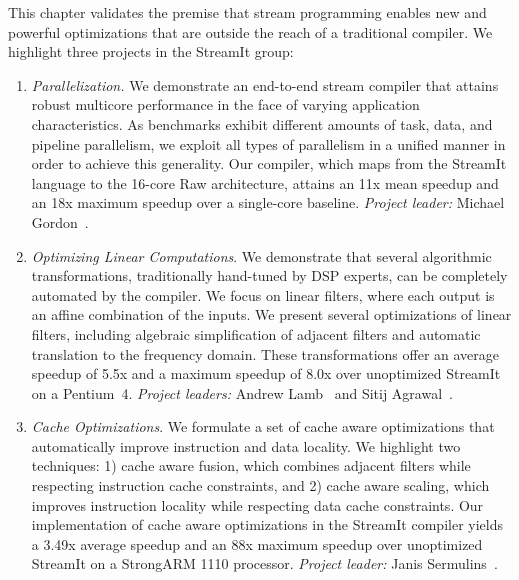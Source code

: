 \label{chap:optimizing}

This chapter validates the premise that stream programming enables new
and powerful optimizations that are outside the reach of a traditional
compiler.  We highlight three projects in the StreamIt group:

\begin{enumerate}

\item {\it Parallelization.}  We demonstrate an end-to-end stream 
compiler that attains robust multicore performance in the face of
varying application characteristics.  As benchmarks exhibit different
amounts of task, data, and pipeline parallelism, we exploit all types
of parallelism in a unified manner in order to achieve this
generality.  Our compiler, which maps from the StreamIt language to
the 16-core Raw architecture, attains an 11x mean speedup and an 18x
maximum speedup over a single-core baseline.  {\it Project leader:}
Michael Gordon~\cite{gordon-asplos06}.

\item {\it Optimizing Linear Computations}.  We demonstrate that 
several algorithmic transformations, traditionally hand-tuned by DSP
experts, can be completely automated by the compiler.  We focus on
linear filters, where each output is an affine combination of the
inputs.  We present several optimizations of linear filters, including
algebraic simplification of adjacent filters and automatic translation
to the frequency domain.  These transformations offer an average
speedup of 5.5x and a maximum speedup of 8.0x over unoptimized
StreamIt on a Pentium~4.  {\it Project leaders:} Andrew
Lamb~\cite{lamb-pldi03,lamb-thesis} and Sitij
Agrawal~\cite{agrawal-cases05,agrawal-thesis}.

\item {\it Cache Optimizations}.   We formulate a set of cache aware 
optimizations that automatically improve instruction and data
locality.  We highlight two techniques: 1) cache aware fusion, which
combines adjacent filters while respecting instruction cache
constraints, and 2) cache aware scaling, which improves instruction
locality while respecting data cache constraints.  Our implementation
of cache aware optimizations in the StreamIt compiler yields a 3.49x
average speedup and an 88x maximum speedup over unoptimized StreamIt
on a StrongARM 1110 processor.  {\it Project leader:} Janis
Sermulins~\cite{sermulins:lctes:2005,sermulins-thesis}.

\end{enumerate}

